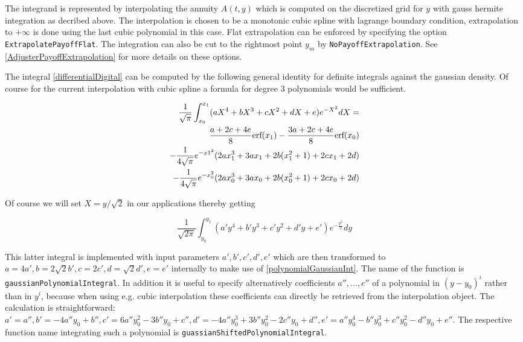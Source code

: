 \documentclass{amsart}
\theoremstyle{plain}
\numberwithin{equation}{section}
\begin{document}
The integrand is represented by interpolating the annuity $A(t,y)$ which is computed on the discretized grid for $y$ with gauss hermite integration as decribed above. The interpolation is chosen to be a monotonic cubic spline with lagrange boundary condition, extrapolation to $+\infty$ is done using the last cubic polynomial in this case. Flat extrapolation can be enforced by specifying the option \verb+ExtrapolatePayoffFlat+. The integration can also be cut to the rightmost point $y_m$ by \verb+NoPayoffExtrapolation+. See \ref{AdjusterPayoffExtrapolation} for more details on these options.

The integral \ref{differentialDigital} can be computed by the following general identity for definite integrals against the gaussian density. Of course for the current interpolation with cubic spline a formula for degree $3$ polynomials would be sufficient.

\begin{eqnarray}\label{polynomialGaussianInt}
\frac{1}{\sqrt{\pi}}\int_{x_0}^{x_1} (aX^4+bX^3+cX^2+dX+e) e^{-X^2} dX = \\
 \frac{a+2c+4e}{8}\textnormal{erf}(x_1) - \frac{3a+2c+4e}{8}\textnormal{erf}(x_0)  \\
- \frac{1}{4\sqrt{\pi}}e^{-x1^2}(2ax_1^3+3ax_1+2b(x_1^2+1)+2cx_1+2d) \\
- \frac{1}{4\sqrt{\pi}} e^{-x_0^2} (2ax_0^3+3ax_0+2b(x_0^2+1)+2cx_0+2d)
\end{eqnarray} 

Of course we will set $X = y/\sqrt{2}$ in our applications  thereby getting

\begin{equation}
\frac{1}{\sqrt{2\pi}}\int_{y_0}^{y_1} (a'y^4+b'y^3+c'y^2+d'y+e') e^{-\frac{y^2}{2}} dy
\end{equation}

This latter integral is implemented with input parameters $a', b', c', d', e'$ which are then transformed
to $a=4a', b=2\sqrt{2}b', c=2c', d=\sqrt{2}d', e=e'$ internally to make use of \ref{polynomialGaussianInt}. The name of the function is
\verb+gaussianPolynomialIntegral+. In addition it is useful to specify alternatively coefficients $a'', ... , e''$ of a polynomial in $(y-y_0)^i$ rather than
in $y^i$, because when using e.g. cubic interpolation these coefficients can directly be retrieved from the interpolation object. The calculation is straightforward: $a' = a'', b'=-4a''y_0+b'', c'=6a''y_0^2-3b''y_0+c'', d'=-4a''y_0^3+3b''y_0^2-2c''y_0+d'', e'=a''y_0^4-b''y_0^3+c''y_0^2-d''y_0+e''$. The respective function
name integrating such a polynomial is \verb+guassianShiftedPolynomialIntegral+.
\end{document}
